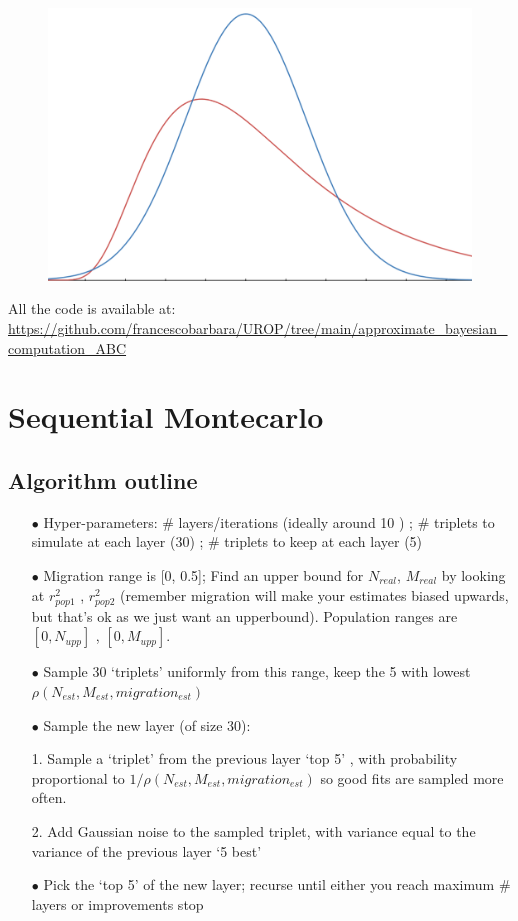 \documentclass[a4paper,12pt]{article}
\begin{document}
{\begin{figure}[H]
    
    \includegraphics[scale=0.6]{19.png}%

\end{figure}%
All the code is available at:\\
\url{
https://github.com/francescobarbara/UROP/tree/main/approximate_bayesian_computation_ABC}

\section{Sequential Montecarlo}
\subsection{Algorithm outline}
\begin{enumerate}
  \item[$\bullet$] Hyper-parameters: \# layers/iterations (ideally around 10 ) ; \# triplets to simulate at each layer (30) ;  \# triplets to keep at each layer (5)
  \item[$\bullet$] Migration range is [0, 0.5]; Find an upper bound for $N_{real}$, $M_{real}$ by looking at $r^2_{pop1}$ , $r^2_{pop2}$  (remember migration will make your estimates biased upwards, but that’s ok as we just want an upperbound). Population ranges are $[0, N_{upp}]$ , $[0, M_{upp}]$.
  \item[$\bullet$] Sample 30 ‘triplets’ uniformly from this range, keep the 5 with lowest $\rho(N_{est}, M_{est}, migration_{est})$
  \item[$\bullet$] Sample the new layer (of size 30):
 \item[1.] Sample a ‘triplet’ from the previous layer ‘top 5’ , with probability proportional to $1/\rho(N_{est}, M_{est}, migration_{est})$   so good fits are sampled more often.
 \item[2.] Add Gaussian noise to the sampled triplet, with variance equal to the variance of the previous layer ‘5 best’ 
\item[$\bullet$] Pick the ‘top 5’ of the new layer; recurse until either you reach maximum \# layers or improvements stop


\end{enumerate}}
\end{document}
